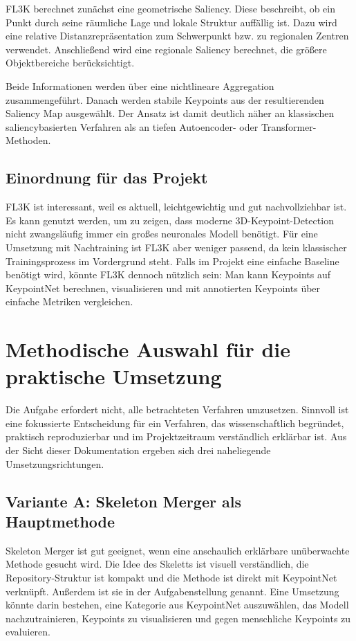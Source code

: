 \documentclass[11pt,a4paper]{article}
\begin{document}
FL3K berechnet zunächst eine geometrische Saliency. Diese beschreibt, ob ein Punkt durch seine räumliche Lage und lokale Struktur auffällig ist. Dazu wird eine relative Distanzrepräsentation zum Schwerpunkt bzw. zu regionalen Zentren verwendet. Anschließend wird eine regionale Saliency berechnet, die größere Objektbereiche berücksichtigt.

Beide Informationen werden über eine nichtlineare Aggregation zusammengeführt. Danach werden stabile Keypoints aus der resultierenden Saliency Map ausgewählt. Der Ansatz ist damit deutlich näher an klassischen saliencybasierten Verfahren als an tiefen Autoencoder- oder Transformer-Methoden.

\subsection{Einordnung für das Projekt}

FL3K ist interessant, weil es aktuell, leichtgewichtig und gut nachvollziehbar ist. Es kann genutzt werden, um zu zeigen, dass moderne 3D-Keypoint-Detection nicht zwangsläufig immer ein großes neuronales Modell benötigt. Für eine Umsetzung mit Nachtraining ist FL3K aber weniger passend, da kein klassischer Trainingsprozess im Vordergrund steht. Falls im Projekt eine einfache Baseline benötigt wird, könnte FL3K dennoch nützlich sein: Man kann Keypoints auf KeypointNet berechnen, visualisieren und mit annotierten Keypoints über einfache Metriken vergleichen.

\section{Methodische Auswahl für die praktische Umsetzung}

Die Aufgabe erfordert nicht, alle betrachteten Verfahren umzusetzen. Sinnvoll ist eine fokussierte Entscheidung für ein Verfahren, das wissenschaftlich begründet, praktisch reproduzierbar und im Projektzeitraum verständlich erklärbar ist. Aus der Sicht dieser Dokumentation ergeben sich drei naheliegende Umsetzungsrichtungen.

\subsection{Variante A: Skeleton Merger als Hauptmethode}

Skeleton Merger ist gut geeignet, wenn eine anschaulich erklärbare unüberwachte Methode gesucht wird. Die Idee des Skeletts ist visuell verständlich, die Repository-Struktur ist kompakt und die Methode ist direkt mit KeypointNet verknüpft. Außerdem ist sie in der Aufgabenstellung genannt. Eine Umsetzung könnte darin bestehen, eine Kategorie aus KeypointNet auszuwählen, das Modell nachzutrainieren, Keypoints zu visualisieren und gegen menschliche Keypoints zu evaluieren.
\end{document}
